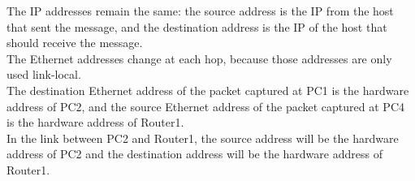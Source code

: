 The IP addresses remain the same: the source address is the IP from the host that sent the message, and the destination address is the IP of the host that should receive the message.\\

The Ethernet addresses change at each hop, because those addresses are only used link-local. \\The destination Ethernet address of the packet captured at PC1 is the hardware address of PC2, and the source Ethernet address of the packet captured at PC4 is the hardware address of Router1. \\In the link between PC2 and Router1, the source address will be the hardware address of PC2 and the destination address will be the hardware address of Router1.